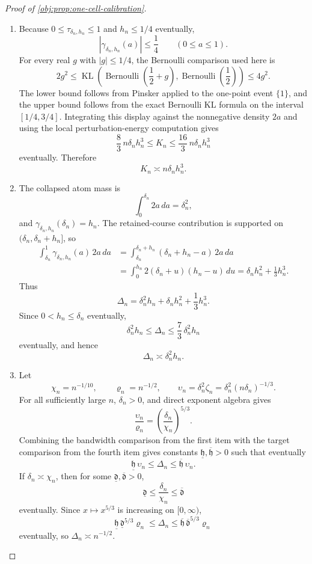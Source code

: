 \begin{proof}[Proof of \cref{obj:prop:one-cell-calibration}]
\begin{enumerate}
\item Because \(0\le\tau_{\delta_n,h_n}\le1\) and \(h_n\le1/4\) eventually,
\[
|\gamma_{\delta_n,h_n}(a)|\le\frac14
\qquad (0\le a\le1).
\]
For every real \(g\) with \(|g|\le1/4\), the Bernoulli comparison used here is
\[
2g^2
\le
\operatorname{KL}\!\left(\operatorname{Bernoulli}\!\left(\frac12+g\right),
\operatorname{Bernoulli}\!\left(\frac12\right)\right)
\le
4g^2 .
\]
The lower bound follows from Pinsker applied to the one-point event
\(\{1\}\), and the upper bound follows from the exact Bernoulli KL formula on
the interval \([1/4,3/4]\).  Integrating this display against the nonnegative
density \(2a\) and using the local perturbation-energy computation gives
\[
\frac83\,n\delta_n h_n^3
\le
K_n
\le
\frac{16}{3}\,n\delta_n h_n^3
\]
eventually.  Therefore
\[
K_n\asymp n\delta_n h_n^3 .
\]

\item The collapsed atom mass is
\[
\int_0^{\delta_n}2a\,da=\delta_n^2,
\]
and \(\gamma_{\delta_n,h_n}(\delta_n)=h_n\).  The retained-course contribution
is supported on \((\delta_n,\delta_n+h_n]\), so
\[
\begin{aligned}
\int_{\delta_n}^1
\gamma_{\delta_n,h_n}(a)\,2a\,da
&=
\int_{\delta_n}^{\delta_n+h_n}
(\delta_n+h_n-a)\,2a\,da  \\
&=
\int_0^{h_n}2(\delta_n+u)(h_n-u)\,du
=
\delta_n h_n^2+\frac13 h_n^3 .
\end{aligned}
\]
Thus
\[
\Delta_n
=
\delta_n^2h_n+\delta_nh_n^2+\frac13 h_n^3 .
\]
Since \(0<h_n\le\delta_n\) eventually,
\[
\delta_n^2h_n
\le
\Delta_n
\le
\frac73\,\delta_n^2h_n
\]
eventually, and hence
\[
\Delta_n\asymp \delta_n^2h_n .
\]

\item Let
\[
\chi_n=n^{-1/10},
\qquad
\varrho_n=n^{-1/2},
\qquad
\upsilon_n=\delta_n^2\zeta_n
=\delta_n^2(n\delta_n)^{-1/3}.
\]
For all sufficiently large \(n\), \(\delta_n>0\), and direct exponent algebra
gives
\[
\frac{\upsilon_n}{\varrho_n}
=
\left(\frac{\delta_n}{\chi_n}\right)^{5/3}.
\]
Combining the bandwidth comparison from the first item with the target
comparison from the fourth item gives constants
\(\underline{\mathfrak h},\overline{\mathfrak h}>0\) such that eventually
\[
\underline{\mathfrak h}\,\upsilon_n
\le
\Delta_n
\le
\overline{\mathfrak h}\,\upsilon_n .
\]
If \(\delta_n\asymp\chi_n\), then for some
\(\underline{\mathfrak d},\overline{\mathfrak d}>0\),
\[
\underline{\mathfrak d}
\le
\frac{\delta_n}{\chi_n}
\le
\overline{\mathfrak d}
\]
eventually.  Since \(x\mapsto x^{5/3}\) is increasing on \([0,\infty)\),
\[
\underline{\mathfrak h}\,\underline{\mathfrak d}^{5/3}\varrho_n
\le
\Delta_n
\le
\overline{\mathfrak h}\,\overline{\mathfrak d}^{5/3}\varrho_n
\]
eventually, so \(\Delta_n\asymp n^{-1/2}\).


\end{enumerate}
\end{proof}
